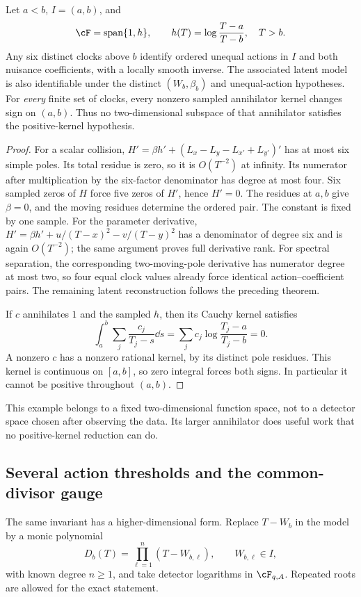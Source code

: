 \begin{proposition}
\label{prop:v84-no-positive}
Let $a<b$, $I=(a,b)$, and
\[
 \cF=\operatorname{span}\{1,h\},\qquad
                 h(T)=\log\frac{T-a}{T-b},\quad T>b.
\]
Any six distinct clocks above $b$ identify ordered unequal actions in
$I$ and both nuisance coefficients, with a locally smooth inverse.
The associated latent model is also identifiable under the distinct
$(W_b,\beta_b)$ and unequal-action hypotheses. For \emph{every}
finite set of clocks, every nonzero sampled annihilator kernel changes
sign on $(a,b)$. Thus no two-dimensional subspace of that annihilator
satisfies the positive-kernel hypothesis.
\end{proposition}
\begin{proof}
For a scalar collision, $H'=\beta h'+(L_x-L_y-L_{x'}+L_{y'})'$
has at most six simple poles. Its total residue is zero, so it is
$O(T^{-2})$ at infinity. Its numerator after multiplication by the
six-factor denominator has degree at most four. Six sampled zeros of
$H$ force five zeros of $H'$, hence $H'=0$. The residues at $a,b$
give $\beta=0$, and the moving residues determine the ordered pair.
The constant is fixed by one sample. For the parameter derivative,
$H'=\beta h'+u/(T-x)^2-v/(T-y)^2$ has a denominator of degree six
and is again $O(T^{-2})$; the same argument proves full derivative rank.
For spectral separation, the corresponding two-moving-pole derivative
has numerator degree at most two, so four equal clock values already
force identical action--coefficient pairs. The remaining latent
reconstruction follows the preceding theorem.

If $c$ annihilates $1$ and the sampled $h$, then its Cauchy kernel
satisfies
\begin{equation}\label{eq:v84-zero-integral}
 \int_a^b\sum_j\frac{c_j}{T_j-s}\dd s
             =\sum_jc_j\log\frac{T_j-a}{T_j-b}=0.
\end{equation}
A nonzero $c$ has a nonzero rational kernel, by its distinct pole
residues. This kernel is continuous on $[a,b]$, so zero integral forces
both signs. In particular it cannot be positive throughout $(a,b)$.
\end{proof}
This example belongs to a fixed two-dimensional function space, not
to a detector space chosen after observing the data. Its larger
annihilator does useful work that no positive-kernel reduction can do.

\subsection{Several action thresholds and the common-divisor gauge}
The same invariant has a higher-dimensional form. Replace $T-W_b$ in
the model by a monic polynomial
\[
 D_b(T)=\prod_{\ell=1}^n(T-W_{b,\ell}),\qquad W_{b,\ell}\in I,
\]
with known degree $n\ge1$, and take detector logarithms in
$\cF_{q,A}$. Repeated roots are allowed for the exact statement.

